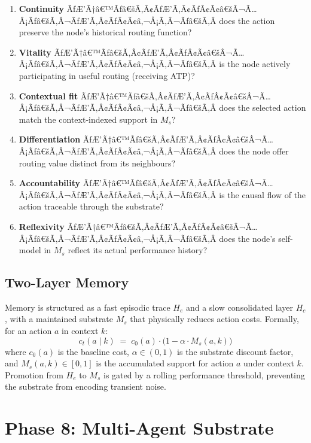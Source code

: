 \documentclass[10pt,twocolumn]{article}
\newcommand{\He}{H_e}
\newcommand{\Hc}{H_c}
\newcommand{\Ms}{M_s}
\begin{document}
\begin{enumerate}[leftmargin=*, itemsep=1pt]
  \item \textbf{Continuity} ÃƒÆ’Ã†â€™Ãƒâ€šÃ‚Â¢ÃƒÆ’Ã‚Â¢ÃƒÂ¢Ã¢â€šÂ¬Ã…Â¡Ãƒâ€šÃ‚Â¬ÃƒÆ’Ã‚Â¢ÃƒÂ¢Ã¢â‚¬Å¡Ã‚Â¬Ãƒâ€šÃ‚Â does the action preserve the node's historical
        routing function?
  \item \textbf{Vitality} ÃƒÆ’Ã†â€™Ãƒâ€šÃ‚Â¢ÃƒÆ’Ã‚Â¢ÃƒÂ¢Ã¢â€šÂ¬Ã…Â¡Ãƒâ€šÃ‚Â¬ÃƒÆ’Ã‚Â¢ÃƒÂ¢Ã¢â‚¬Å¡Ã‚Â¬Ãƒâ€šÃ‚Â is the node actively participating in useful
        routing (receiving ATP)?
  \item \textbf{Contextual fit} ÃƒÆ’Ã†â€™Ãƒâ€šÃ‚Â¢ÃƒÆ’Ã‚Â¢ÃƒÂ¢Ã¢â€šÂ¬Ã…Â¡Ãƒâ€šÃ‚Â¬ÃƒÆ’Ã‚Â¢ÃƒÂ¢Ã¢â‚¬Å¡Ã‚Â¬Ãƒâ€šÃ‚Â does the selected action match the
        context-indexed support in $\Ms$?
  \item \textbf{Differentiation} ÃƒÆ’Ã†â€™Ãƒâ€šÃ‚Â¢ÃƒÆ’Ã‚Â¢ÃƒÂ¢Ã¢â€šÂ¬Ã…Â¡Ãƒâ€šÃ‚Â¬ÃƒÆ’Ã‚Â¢ÃƒÂ¢Ã¢â‚¬Å¡Ã‚Â¬Ãƒâ€šÃ‚Â does the node offer routing value distinct
        from its neighbours?
  \item \textbf{Accountability} ÃƒÆ’Ã†â€™Ãƒâ€šÃ‚Â¢ÃƒÆ’Ã‚Â¢ÃƒÂ¢Ã¢â€šÂ¬Ã…Â¡Ãƒâ€šÃ‚Â¬ÃƒÆ’Ã‚Â¢ÃƒÂ¢Ã¢â‚¬Å¡Ã‚Â¬Ãƒâ€šÃ‚Â is the causal flow of the action traceable
        through the substrate?
  \item \textbf{Reflexivity} ÃƒÆ’Ã†â€™Ãƒâ€šÃ‚Â¢ÃƒÆ’Ã‚Â¢ÃƒÂ¢Ã¢â€šÂ¬Ã…Â¡Ãƒâ€šÃ‚Â¬ÃƒÆ’Ã‚Â¢ÃƒÂ¢Ã¢â‚¬Å¡Ã‚Â¬Ãƒâ€šÃ‚Â does the node's self-model in $\Ms$ reflect its
        actual performance history?
\end{enumerate}

\subsection{Two-Layer Memory}

Memory is structured as a fast episodic trace $\He$ and a slow consolidated
layer $\Hc$, with a maintained substrate $\Ms$ that physically reduces
action costs.
Formally, for an action $a$ in context $k$:
\[
  c_t(a \mid k) \;=\; c_0(a) \cdot \bigl(1 - \alpha \cdot \Ms(a, k)\bigr)
\]
where $c_0(a)$ is the baseline cost, $\alpha \in (0,1)$ is the substrate
discount factor, and $\Ms(a,k) \in [0,1]$ is the accumulated support for
action $a$ under context $k$.
Promotion from $\He$ to $\Ms$ is gated by a rolling performance threshold,
preventing the substrate from encoding transient noise.

\section{Phase 8: Multi-Agent Substrate}
\label{sec:phase8}
\end{document}
